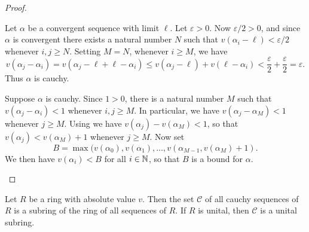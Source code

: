 \begin{proof}
\begin{inlineproplist}
\item Let \(\alpha\) be a convergent sequence with limit \(\ell\).
Let \(\varepsilon > 0\).
Now \(\varepsilon/2 > 0\), and since \(\alpha\) is convergent there exists a natural number \(N\) such that \(v(\alpha_i - \ell) < \varepsilon/2\) whenever \(i,j \geq N\).
Setting \(M = N\), whenever \(i \geq M\), we have \[ v(\alpha_j - \alpha_i) = v(\alpha_j - \ell + \ell - \alpha_i) \leq v(\alpha_j - \ell) + v(\ell - \alpha_i) < \frac{\varepsilon}{2} + \frac{\varepsilon}{2} = \varepsilon. \]
Thus \(\alpha\) is cauchy.
\item Suppose \(\alpha\) is cauchy.
Since \(1 > 0\), there is a natural number \(M\) such that \(v(\alpha_j - \alpha_i) < 1\) whenever \(i,j \geq M\).
In particular, we have \(v(\alpha_j - \alpha_M) < 1\) whenever \(j \geq M\).
Using  we have \(v(\alpha_j) - v(\alpha_M) < 1\), so that \(v(\alpha_j) < v(\alpha_M) + 1\) whenever \(j \geq M\).
Now set \[ B = \max(v(\alpha_0), v(\alpha_1), \ldots, v(\alpha_{M-1}, v(\alpha_M) + 1). \]
We then have \(v(\alpha_i) < B\) for all \(i \in \mathbb{N}\), so that \(B\) is a bound for \(\alpha\).
\end{inlineproplist}
\end{proof}

\begin{prop}
Let \(R\) be a ring with absolute value \(v\).
Then the set \(\mathcal{C}\) of all cauchy sequences of \(R\) is a subring of the ring of all sequences of \(R\).
If \(R\) is unital, then \(\mathcal{C}\) is a unital subring.
\end{prop}

